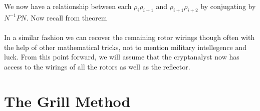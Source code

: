 We now have a relationship between each $\rho_i\rho_{i+1}$ and
$\rho_{i+1}\rho_{i+2}$ by conjugating by $N^{-1}PN$. Now recall from
theorem %
\\\\In a similar fashion we can recover the remaining rotor wirings
though often with the help of other mathematical tricks, not to
mention military intellegence and luck. From this point forward, we
will assume that the cryptanalyst now has access to the wirings of
all the rotors as well as the reflector.

\section{The Grill Method}

